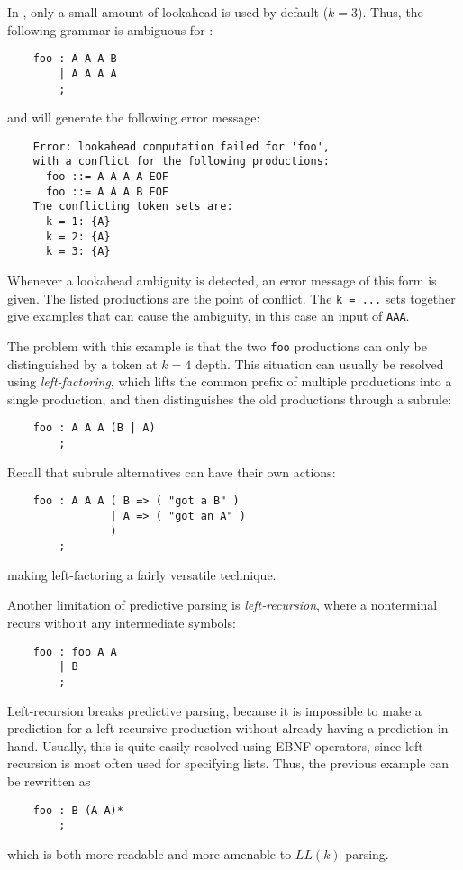 In \antlr{}, only a small amount of lookahead is used by default ($k = 3$).  Thus, the following grammar is ambiguous for \antlr{}:
\begin{verbatim}
    foo : A A A B
        | A A A A
        ;
\end{verbatim}
and will generate the following error message:
\begin{verbatim}
    Error: lookahead computation failed for 'foo',
    with a conflict for the following productions:
      foo ::= A A A A EOF
      foo ::= A A A B EOF
    The conflicting token sets are:
      k = 1: {A}
      k = 2: {A}
      k = 3: {A}
\end{verbatim}
Whenever a lookahead ambiguity is detected, an error message of this form is given.  The listed productions are the point of conflict.  The {\tt k = ...} sets together give examples that can cause the ambiguity, in this case an input of {\tt AAA}.

The problem with this example is that the two {\tt foo} productions can only be distinguished by a token at $k = 4$ depth.  This situation can usually be resolved using \emph{left-factoring}, which lifts the common prefix of multiple productions into a single production, and then distinguishes the old productions through a subrule:
\begin{verbatim}
    foo : A A A (B | A)
        ;
\end{verbatim}
Recall that subrule alternatives can have their own actions:
\begin{verbatim}
    foo : A A A ( B => ( "got a B" ) 
                | A => ( "got an A" )
                )
        ;
\end{verbatim}
making left-factoring a fairly versatile technique.

Another limitation of predictive parsing is \emph{left-recursion}, where a nonterminal recurs without any intermediate symbols:
\begin{verbatim}
    foo : foo A A
        | B
        ;
\end{verbatim}
Left-recursion breaks predictive parsing, because it is impossible to make a prediction for a left-recursive production without already having a prediction in hand.  Usually, this is quite easily resolved using EBNF operators, since left-recursion is most often used for specifying lists.  Thus, the previous example can be rewritten as
\begin{verbatim}
    foo : B (A A)*
        ;
\end{verbatim}
which is both more readable and more amenable to $LL(k)$ parsing.

